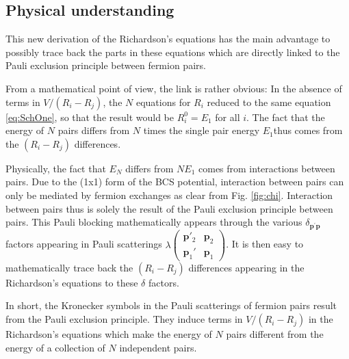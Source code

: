 \documentclass[aps,prb,superscriptaddress,twocolumn]{revtex4}
\newcommand{\vp}{\ensuremath{\mathbf{p}}}
\begin{document}
\subsection{Physical understanding}

This new derivation of the Richardson's equations has the main advantage to
possibly trace back the parts in these equations which are directly linked
to the Pauli exclusion principle between fermion pairs.

From a mathematical point of view, the link is rather obvious: In the
absence of terms in $V/(R_i-R_j)$, the $N$ equations for $R_i$ reduced to
the same equation \eqref{eq:SchOne}, so that the result would be $R^0_i=%
E _1$ for all $i$. The fact that the energy of $N$ pairs differs
from $N$ times the single pair energy $E_1$thus comes from the $(R_i-R_j)$
differences.

Physically, the fact that $E _N$ differs from $NE _1$
comes from interactions between pairs. Due to the (1x1) form of the BCS
potential, interaction between pairs can only be mediated by fermion
exchanges as clear from Fig. \ref{fig:chi}. Interaction between pairs thus
is solely the result of the Pauli exclusion principle between pairs. This
Pauli blocking mathematically appears through the various $\delta_{\mathbf{p}
^{\prime}\mathbf{p} }$ factors appearing in Pauli scatterings $\lambda\left(%
\begin{smallmatrix}\vp'_2&\vp_2\\\vp_1'&\vp_1\end{smallmatrix}\right)  $. It
is then easy to mathematically trace back the $(R_i-R_j)$ differences
appearing in the Richardson's equations to these $\delta$ factors.

In short, the Kronecker symbols in the Pauli scatterings of fermion pairs
result from the Pauli exclusion principle. They induce terms in $V/(R_i-R_j)$
in the Richardson's equations which make the energy of $N$ pairs different
from the energy of a collection of $N$ independent pairs.
\end{document}
